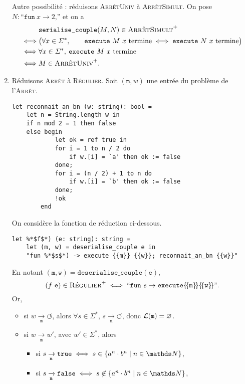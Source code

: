 \begin{enumerate}
		Autre possibilité : réduisons \textsc{ArrêtUniv} à \textsc{ArrêtSimult}. On pose $N : \text{``}\texttt{fun}\ x \to 2\text{,''}$ et on a 
		\begin{align*}
			&\texttt{serialise\_couple} (M, N) \in \textsc{ArrêtSimult}^+\\
			\iff& \big(\forall x \in \Sigma^*, \qquad \texttt{execute}\ M\ x \text{ termine} \iff \texttt{execute}\ N\ x \text{ termine}\big)\\
			\iff& \forall x \in \Sigma^*,\:\texttt{execute}\ M\ x \text{ termine}\\
			\iff& M \in \textsc{ArrêtUniv}^+.
		\end{align*}
	\item Réduisons \textsc{Arrêt} à \textsc{Régulier}. Soit $(\texttt{m}, w)$ une entrée du problème de l'\textsc{Arrêt}.
		\begin{lstlisting}[language=caml,caption={Machine reconnaissant le langage $\{a^n \cdot b^n \mid n \in \N\}$}]
let reconnait_an_bn (w: string): bool =
	let n = String.length w in
	if n mod 2 = 1 then false
	else begin
			let ok = ref true in
			for i = 1 to n / 2 do
				if w.[i] = `a' then ok := false
			done;
			for i = (n / 2) + 1 to n do
				if w.[i] = `b' then ok := false
			done;
			!ok
		end
		\end{lstlisting}
		On considère la fonction de réduction ci-dessous.
		\begin{lstlisting}[language=caml]
let %*$f$*) (e: string): string =
	let (m, w) = deserialise_couple e in
	"fun %*$s$*) -> execute {{m}} {{w}}; reconnait_an_bn {{w}}"
		\end{lstlisting}
		En notant $(\texttt{m},\texttt{w}) = \texttt{deserialise\_couple}(\texttt{e})$, \[
			(f\ \texttt{e}) \in \textsc{Régulier}^+ \iff \text{``}\texttt{fun}\ s \to \texttt{execute} \{\!\{\texttt{m}\}\!\} \{\!\{\texttt{w}\}\!\}\text{''}
		.\]
		Or,
		\begin{itemize}
			\item si $w \xrightarrow[\texttt{m}]{} {\circlearrowleft}$, alors $\forall s \in \Sigma^*$, $s \xrightarrow[\texttt{m}]{} {\circlearrowleft}$, donc $\mathcal{L}(\texttt{m}) = \O$.
			\item si $w \xrightarrow[\texttt{m}]{} w'$, avec $w' \in \Sigma^*$, alors
				\begin{itemize}
					\item si $s \xrightarrow[\texttt{m}]{} \texttt{true} \iff s \in \{a^n \cdot b^n  \mid n \in \N\}$,
					\item si $s \xrightarrow[\texttt{m}]{} \texttt{false} \iff s \not\in \{a^n \cdot b^n  \mid n \in \N\}$,

\end{itemize}
\end{itemize}
\end{enumerate}
